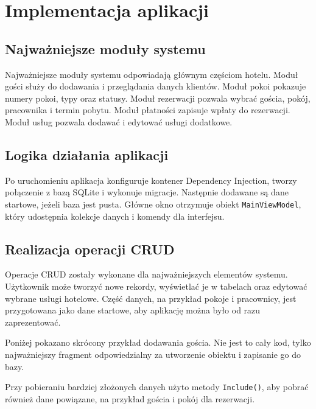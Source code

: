 \chapter{Implementacja aplikacji}

\section{Najważniejsze moduły systemu}

Najważniejsze moduły systemu odpowiadają głównym częściom hotelu. Moduł gości służy do dodawania i przeglądania danych klientów. Moduł pokoi pokazuje numery pokoi, typy oraz statusy. Moduł rezerwacji pozwala wybrać gościa, pokój, pracownika i termin pobytu. Moduł płatności zapisuje wpłaty do rezerwacji. Moduł usług pozwala dodawać i edytować usługi dodatkowe.

\section{Logika działania aplikacji}

Po uruchomieniu aplikacja konfiguruje kontener Dependency Injection, tworzy połączenie z bazą SQLite i wykonuje migracje. Następnie dodawane są dane startowe, jeżeli baza jest pusta. Główne okno otrzymuje obiekt \texttt{MainViewModel}, który udostępnia kolekcje danych i komendy dla interfejsu.



\section{Realizacja operacji CRUD}

Operacje CRUD zostały wykonane dla najważniejszych elementów systemu. Użytkownik może tworzyć nowe rekordy, wyświetlać je w tabelach oraz edytować wybrane usługi hotelowe. Część danych, na przykład pokoje i pracownicy, jest przygotowana jako dane startowe, aby aplikację można było od razu zaprezentować.

Poniżej pokazano skrócony przykład dodawania gościa. Nie jest to cały kod, tylko najważniejszy fragment odpowiedzialny za utworzenie obiektu i zapisanie go do bazy.



Przy pobieraniu bardziej złożonych danych użyto metody \texttt{Include()}, aby pobrać również dane powiązane, na przykład gościa i pokój dla rezerwacji.

